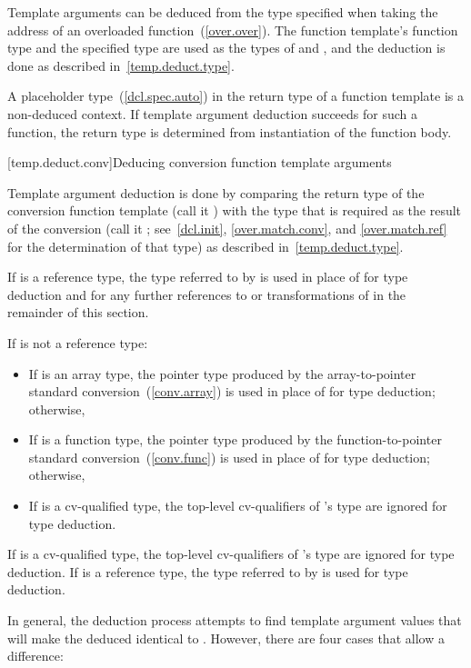 \pnum
Template arguments can be deduced from the type specified when taking
the address of an overloaded function~(\ref{over.over}).
The function template's function type and the specified type
are used as the types of
and
,
and the deduction is done as
described in~\ref{temp.deduct.type}.

\pnum
A placeholder type~(\ref{dcl.spec.auto}) in the return type of a
function template is a non-deduced context. If template argument
deduction succeeds for such a function, the return type is determined
from instantiation of the function body.

[temp.deduct.conv]{Deducing conversion function template arguments}

\pnum
Template argument deduction is done by comparing the return type of
the
conversion function template
(call it
)
with the type that is
required as the result of the conversion (call it
; see~\ref{dcl.init}, \ref{over.match.conv}, and \ref{over.match.ref}
for the determination of that type)
as described in~\ref{temp.deduct.type}.

\pnum
If  is a reference type, the type referred to by  is used in place
of  for type deduction and for any further references to or transformations of
 in the remainder of this section.

\pnum
If
is not a reference type:

\begin{itemize}
\item
If
is an array type, the pointer type produced by the
array-to-pointer standard conversion~(\ref{conv.array}) is used in place of
for type
deduction; otherwise,
\item
If
is a function type, the pointer type produced by the
function-to-pointer standard conversion~(\ref{conv.func}) is used in place of
for
type deduction; otherwise,
\item
If
is a cv-qualified type, the top-level cv-qualifiers of
's
type are ignored for type deduction.
\end{itemize}

\pnum
If
is a cv-qualified type, the top-level cv-qualifiers of
's
type are ignored for type deduction.
If
is a
reference type, the type referred to by
is used for type deduction.

\pnum
In general, the deduction process attempts to find template argument
values that will make the deduced
identical to
.
However, there are four cases that allow a difference:

